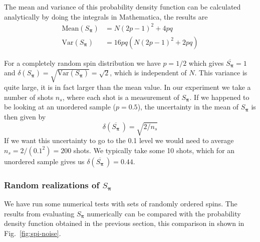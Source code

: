 \documentclass[11pt,letter]{article}
\newcommand{\bv}[1]{\ensuremath{\bm{#1}}}
\begin{document}
The mean and variance of this probability density function can be calculated
analytically by doing the integrals in Mathematica,  the results are
\begin{equation}
\begin{split} 
  \text{Mean}( S_{\bv{\pi}} ) & = N(2p-1)^{2} + 4pq \\ 
  \text{Var}( S_{\bv{\pi}} ) &  = 16pq( N(2p-1)^{2} + 2pq ) 
\end{split}
\end{equation}

For a completely random spin distribution we have $p=1/2$ which gives
$\overline{S_{\bv{\pi}}}=1$  and $\delta(S_{\bv{\pi}}) =
\sqrt{\text{Var}(S_{\bv{\pi}})}=\sqrt{2}$, which is independent of $N$.  This
variance is quite large, it is in fact larger than the mean value.   In our
experiment we take a number of shots $n_{s}$, where each shot is a measurement
of $S_{\bv{\pi}}$.  If we happened to be looking at an unordered sample
($p=0.5$), the uncertainty in the mean of $S_{\bv{\pi}}$ is then given by
\begin{equation}
  \delta\left(\overline{S_{\bv{\pi}}}\,\right) = \sqrt{2/n_{s}}
\end{equation} 
If we want this uncertainty to go to the 0.1 level we would need to average
$n_{s} = 2/(0.1^{2}) = 200$ shots.  We typically take some 10 shots, which for
an unordered sample gives us
$\delta\left(\overline{S_{\bv{\pi}}}\,\right)=0.44$.

\subsubsection{Random realizations of $S_{\bv{\pi}}$}

We have run some numerical tests with sets of randomly ordered spins.   The
results from evaluating  $S_{\bv{\pi}}$ numerically can be compared with the
probability density function obtained in the previous section,  this comparison
in shown in Fig.~\ref{fig:spi-noise}.
\end{document}
